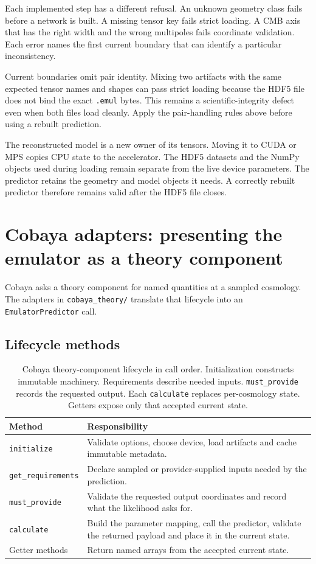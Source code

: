 \documentclass[10pt,aps,prd,twocolumn,nofootinbib]{revtex4-2}
\newcommand{\code}[1]{\texttt{#1}}
\begin{document}
Each implemented step has a different refusal.  An unknown geometry class
fails before a network is built.  A missing tensor key fails strict loading.
A CMB axis that has the right width and the wrong multipoles fails coordinate
validation.  Each error names the first current boundary that can identify a
particular inconsistency.

Current boundaries omit pair identity.  Mixing two artifacts with the same
expected tensor names and shapes can pass strict loading because the HDF5 file
does not bind the exact \code{.emul} bytes.  This remains a scientific-integrity
defect even when both files load cleanly.  Apply the pair-handling rules above
before using a rebuilt prediction.

The reconstructed model is a new owner of its tensors.  Moving it to CUDA or
MPS copies CPU state to the accelerator.  The HDF5 datasets and the NumPy
objects used during loading remain separate from the live device parameters.
The predictor retains the geometry and model objects it needs.  A correctly
rebuilt predictor therefore remains valid after the HDF5 file closes.

\section{Cobaya adapters: presenting the emulator as a theory component}
\label{chap:adapters}

Cobaya asks a theory component for named quantities at a sampled cosmology.
The adapters in \code{cobaya\_theory/} translate that lifecycle into an
\code{EmulatorPredictor} call.

\subsection{Lifecycle methods}

\begin{table}[t]
\centering
\begin{tabular}{p{}p{}}
\toprule
Method & Responsibility \\
\midrule
\code{initialize} & Validate options, choose device, load artifacts and cache
immutable metadata.  \\
\code{get\_requirements} & Declare sampled or provider-supplied inputs needed
by the prediction.  \\
\code{must\_provide} & Validate the requested output coordinates and record
what the likelihood asks for.  \\
\code{calculate} & Build the parameter mapping, call the predictor, validate
the returned payload and place it in the current state.  \\
Getter methods & Return named arrays from the accepted current state.  \\
\bottomrule
\end{tabular}
\caption{Cobaya theory-component lifecycle in call order.  Initialization
constructs immutable machinery.  Requirements describe needed inputs.
\code{must\_provide} records the requested output.  Each \code{calculate}
replaces per-cosmology state.  Getters expose only that accepted current state.}
\label{tab:cobaya-lifecycle}
\end{table}
\end{document}
